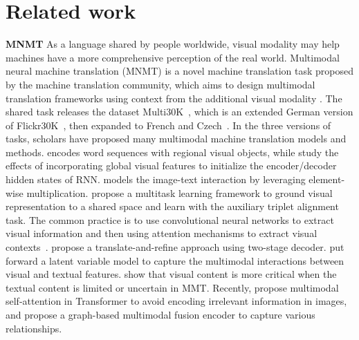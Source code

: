 \documentclass[11pt]{article}
\begin{document}
\section{Related work}
\label{sec:related}
\textbf{MNMT}   As a language shared by people worldwide, visual modality may help machines have a more comprehensive perception of the real world. Multimodal neural machine translation (MNMT) is a novel machine translation task proposed by the machine translation community, which aims to design multimodal translation frameworks using context from the additional visual modality \cite{specia2016shared}. The shared task releases the dataset Multi30K~\cite{elliott2016multi30k}, which is an extended German version of Flickr30K~\cite{young2014image}, then expanded to French and Czech~\cite{elliott2017findings,barrault2018findings}. In the three versions of tasks, scholars have proposed many multimodal machine translation models and methods. \citet{huang2016attention}  encodes word sequences with regional visual objects, while \citet{calixto2017incorporating} study the effects of incorporating global visual features to initialize the encoder/decoder hidden states of RNN. \citet{caglayan2017lium} models the image-text interaction by leveraging element-wise multiplication. \citet{elliott2017imagination} propose a multitask learning framework to ground visual representation to a shared space and learn with the auxiliary triplet alignment task. The common practice is to use convolutional neural networks to extract visual information and then using attention mechanisms to extract visual contexts~\cite{caglayan2016multimodal,calixto2016dcu,libovicky2017attention}. \citet{ive2019distilling}  propose a translate-and-refine approach using two-stage decoder. \citet{calixto2018latent} put forward a latent variable model to capture the multimodal interactions between visual and textual features. \citet{caglayan2019probing} show that visual content is more critical when the textual content is limited or uncertain in MMT. Recently, \citet{yao2020multimodal} propose multimodal self-attention in Transformer to avoid encoding irrelevant information in images, and \citet{yin2020novel} propose a graph-based multimodal fusion encoder to capture various relationships.
\end{document}

